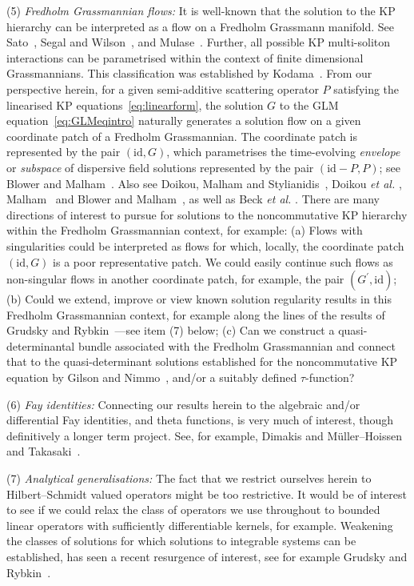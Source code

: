 \documentclass[5p,twocolumn]{elsarticle}
\newcommand*{\id}{{\mathrm{id}}}
\begin{document}
(5) \emph{Fredholm Grassmannian flows:} It is well-known that the solution to the KP hierarchy can be interpreted as a flow on a Fredholm Grassmann manifold.
See Sato~\cite{SatoI,SatoII}, Segal and Wilson~\cite{SW}, and Mulase~\cite{Mu84}.
Further, all possible KP multi-soliton interactions can be parametrised within the context of finite dimensional Grassmannians. This classification was established by Kodama~\cite{Kodama}.
From our perspective herein, for a given semi-additive scattering operator $P$ satisfying the linearised KP equations~\eqref{eq:linearform},
the solution $G$ to the GLM equation~\eqref{eq:GLMeqintro} naturally generates a solution flow on a given coordinate patch of a Fredholm Grassmannian.
The coordinate patch is represented by the pair $(\id,G)$,
which parametrises the time-evolving \emph{envelope} or \emph{subspace} of dispersive field solutions represented by the pair $(\id-P,P)$; see Blower and Malham~\cite{BM}.
Also see Doikou, Malham and Stylianidis~\cite{DMS}, Doikou \textit{et al.\/} \cite{DMSWa,DMSWc}, Malham~\cite{MKdV} and Blower and Malham~\cite{BM-KP}, as well as Beck \textit{et al.\/} \cite{BDMSa,BDMSb}.
There are many directions of interest to pursue for solutions to the noncommutative KP hierarchy within the Fredholm Grassmannian context, for example:
(a) Flows with singularities could be interpreted as flows for which, locally, the coordinate patch $(\id,G)$ is a poor representative patch.
We could easily continue such flows as non-singular flows in another coordinate patch, for example, the pair $(G^\prime,\id)$;
(b) Could we extend, improve or view known solution regularity results in this Fredholm Grassmannian context,
for example along the lines of the results of Grudsky and Rybkin~\cite{GR}---see item (7) below;
(c) Can we construct a quasi-determinantal bundle associated with the Fredholm Grassmannian and connect that to the quasi-determinant solutions
established for the noncommutative KP equation by Gilson and Nimmo~\cite{GN}, and/or a suitably defined $\tau$-function?

(6) \emph{Fay identities:} Connecting our results herein to the algebraic and/or differential Fay identities, and theta functions,
is very much of interest, though definitively a longer term project.
See, for example, Dimakis and M\"uller--Hoissen~\cite{DMH} and Takasaki~\cite{Takasaki}.

(7) \emph{Analytical generalisations:} The fact that we restrict ourselves herein to Hilbert--Schmidt valued operators might be too restrictive.
It would be of interest to see if we could relax the class of operators we use throughout to bounded linear operators with sufficiently differentiable kernels, for example.
Weakening the classes of solutions for which solutions to integrable systems can be established, has seen a recent resurgence of interest, see for example Grudsky and Rybkin~\cite{GR}.
\end{document}
